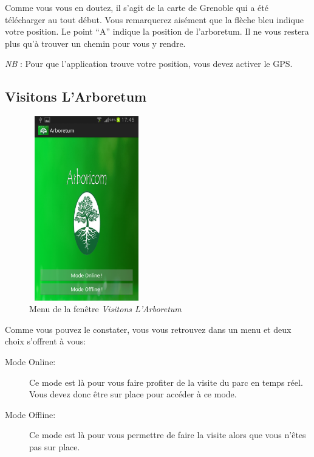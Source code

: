 \documentclass[a4paper,11pt]{article}
\begin{document}
    Comme vous vous en doutez, il s'agit de la carte de Grenoble qui a été télécharger au tout début.
    Vous remarquerez aisément que la flèche bleu indique votre position. Le point ``A'' indique la position de l'arboretum.
    Il ne vous restera plus qu'à trouver un chemin pour vous y rendre.
    
   \textit{NB} : Pour que l'application trouve votre position, vous devez activer le GPS.
   
   \subsection{Visitons L'Arboretum}
    \begin{figure}[H]
     \begin{center}
      \includegraphics[width=5cm,height=8cm]{visitonsMenu.png}
    \caption{Menu de la fenêtre \textit{Visitons L'Arboretum}}
     \end{center}
    \end{figure}
    \newpage
    Comme vous pouvez le constater, vous vous retrouvez dans un menu et deux choix s'offrent à vous:
    \begin{description}
     \item [Mode Online:] Ce mode est là pour vous faire profiter de la visite du parc en temps réel. Vous devez donc être sur place pour accéder 
     à ce mode.
     \item [Mode Offline:] Ce mode est là pour vous permettre de faire la visite alors que vous n'êtes pas sur place.
    \end{description}
   
\end{document}
